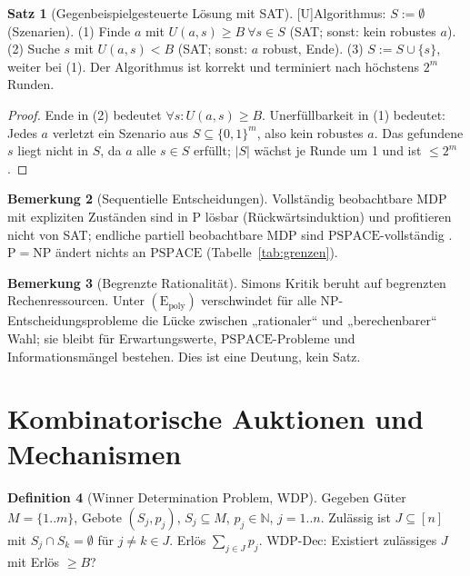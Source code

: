 \documentclass[a4paper,12pt]{article}
\theoremstyle{definition}
\newtheorem{definition}{Definition}[section]
\newtheorem{satz}[definition]{Satz}
\newtheorem{bemerkung}[definition]{Bemerkung}
\newcommand{\tU}{\textsf{\small[U]}}   %
\newcommand{\NN}{\mathbb{N}}
\newcommand{\bits}{\{0,1\}}
\newcommand{\cP}{\ensuremath{\mathrm{P}}}
\newcommand{\cNP}{\ensuremath{\mathrm{NP}}}
\newcommand{\cPSPACE}{\ensuremath{\mathrm{PSPACE}}}
\newcommand{\Epoly}{(\mathrm{E}_{\mathrm{poly}})}
\begin{document}
\begin{satz}[Gegenbeispielgesteuerte Lösung mit SAT]\tU\label{satz:cegar}
Algorithmus: \(S:=\emptyset\) (Szenarien). (1) Finde \(a\) mit \(U(a,s)\ge B\ \forall s\in S\) (SAT; sonst: kein robustes \(a\)). (2) Suche \(s\) mit \(U(a,s)<B\) (SAT; sonst: \(a\) robust, Ende). (3) \(S:=S\cup\{s\}\), weiter bei (1). Der Algorithmus ist korrekt und terminiert nach höchstens \(2^m\) Runden.
\end{satz}
\begin{proof}
Ende in (2) bedeutet \(\forall s:U(a,s)\ge B\). Unerfüllbarkeit in (1) bedeutet: Jedes \(a\) verletzt ein Szenario aus \(S\subseteq\bits^m\), also kein robustes \(a\). Das gefundene \(s\) liegt nicht in \(S\), da \(a\) alle \(s\in S\) erfüllt; \(|S|\) wächst je Runde um 1 und ist \(\le2^m\).
\end{proof}

\begin{bemerkung}[Sequentielle Entscheidungen]
Vollständig beobachtbare MDP mit expliziten Zuständen sind in \(\cP\) lösbar (Rückwärtsinduktion) und profitieren nicht von SAT; endliche partiell beobachtbare MDP sind \(\cPSPACE\)-vollständig \cite{papadimitriou1987}. \(\cP=\cNP\) ändert nichts an \(\cPSPACE\) (Tabelle~\ref{tab:grenzen}).
\end{bemerkung}

\begin{bemerkung}[Begrenzte Rationalität]
Simons Kritik \cite{simon1955} beruht auf begrenzten Rechenressourcen. Unter \(\Epoly\) verschwindet für alle NP-Entscheidungsprobleme die Lücke zwischen „rationaler“ und „berechenbarer“ Wahl; sie bleibt für Erwartungswerte, \(\cPSPACE\)-Probleme und Informationsmängel bestehen. Dies ist eine Deutung, kein Satz.
\end{bemerkung}

\section{Kombinatorische Auktionen und Mechanismen}
\label{eco:auctions}

\begin{definition}[Winner Determination Problem, WDP]\label{def:wdp}
Gegeben Güter \(M=\{1..m\}\), Gebote \((S_j,p_j)\), \(S_j\subseteq M\), \(p_j\in\NN\), \(j=1..n\). Zulässig ist \(J\subseteq[n]\) mit \(S_j\cap S_k=\emptyset\) für \(j\ne k\in J\). Erlös \(\sum_{j\in J}p_j\). WDP-Dec: Existiert zulässiges \(J\) mit Erlös \(\ge B\)?
\end{definition}
\end{document}

